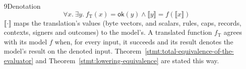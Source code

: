 \begin{perchdefinition}{9}{Denotation}\label{def:denotation}
\[\forall x.\ \exists y.\ f_{\mathrm{T}}(x) = \mathsf{ok}(y) \land \llbracket y \rrbracket = f(\llbracket x \rrbracket)\]
\(\llbracket \cdot \rrbracket\) maps the translation's values (byte vectors,  and  scalars, rules, caps, records, contexts, signers and outcomes) to the model's. A translated function \(f_{\mathrm{T}}\) agrees with its model \(f\) when, for every input, it succeeds and its result denotes the model's result on the denoted input. Theorem~\ref{stmt:total-equivalence-of-the-evaluator} and Theorem~\ref{stmt:lowering-equivalence} are stated this way.
\end{perchdefinition}
